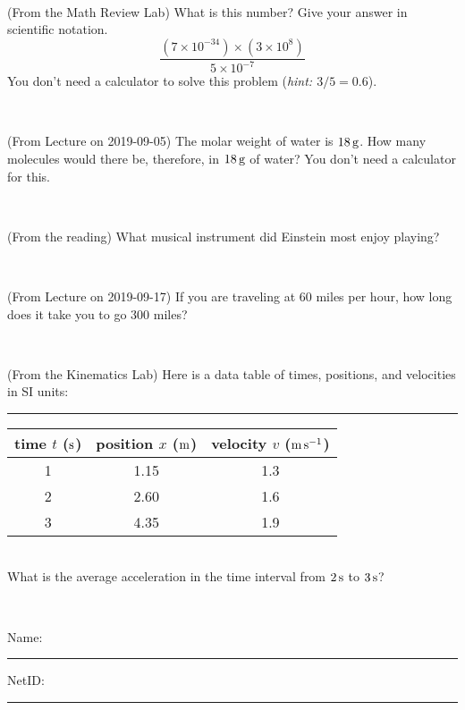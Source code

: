 \documentclass[12pt, letterpaper]{article}
\begin{document}
\vfill ~

\begin{problem} (From the Math Review Lab)
What is this number? Give your answer in scientific notation.
$$
\frac{(7\times10^{-34})\times(3\times10^8)}{5\times10^{-7}}
$$
You don't need a calculator to solve this problem (\textit{hint: $3/5=0.6$}).
\end{problem}


\vfill ~


\clearpage


\begin{problem} (From Lecture on 2019-09-05)
The molar weight of water is $18\,\mathrm{g}$. How many molecules would there
be, therefore, in $18\,\mathrm{g}$ of water? You don't need a calculator for
this.
\end{problem}


\vfill ~

\begin{problem} (From the reading)
What musical instrument did Einstein most enjoy playing?
\end{problem}


\vfill ~

\begin{problem} (From Lecture on 2019-09-17)
If you are traveling at 60 miles per hour, how long does
it take you to go 300 miles?
\end{problem}


\vfill ~

\begin{problem} (From the Kinematics Lab)
Here is a data table of times, positions, and velocities in SI units:\\
\rule{1.0in}{0pt}\begin{tabular}{c|c|c}
time $t$ ($\mathrm{s}$) & position $x$ ($\mathrm{m}$) & velocity $v$ ($\mathrm{m}\,\mathrm{s}^{-1}$) \\
\hline
1 & 1.15 & 1.3 \\
2 & 2.60 & 1.6 \\
3 & 4.35 & 1.9 \\
\hline
\end{tabular}\\
What is the average acceleration in the time interval from $2\,\mathrm{s}$ to $3\,\mathrm{s}$?
\end{problem}


\vfill ~


\cleardoublepage



\noindent
Name: \rule[-1ex]{0.60\textwidth}{0.1pt}
NetID: \rule[-1ex]{0.20\textwidth}{0.1pt}
\end{document}
